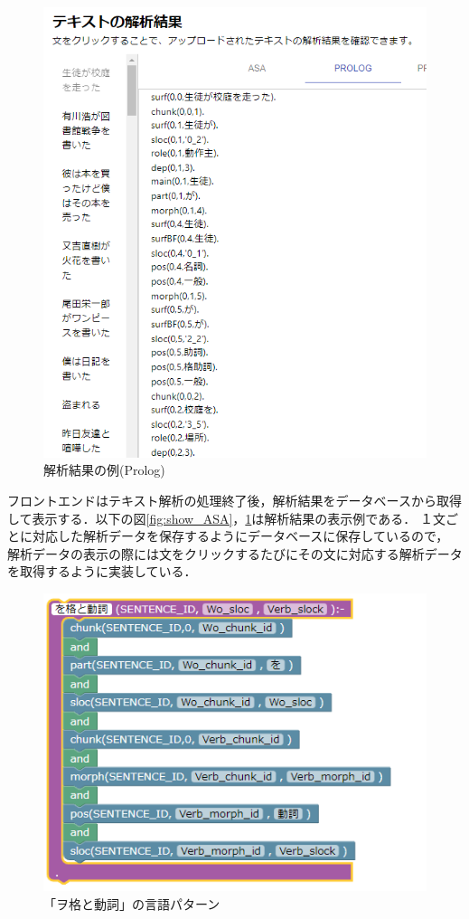 \documentclass{FITpaper}
\begin{document}
\begin{figure}[htbp]
  \centering
  \includegraphics[scale=0.4]{fig/convert_result_prolog.png}
  \caption{解析結果の例(Prolog)}
  \label{fig:show_prolog}
\end{figure}

フロントエンドはテキスト解析の処理終了後，解析結果をデータベースから取得して表示する．以下の図\ref{fig:show_ASA}，\ref{fig:show_prolog}は解析結果の表示例である．
１文ごとに対応した解析データを保存するようにデータベースに保存しているので，
解析データの表示の際には文をクリックするたびにその文に対応する解析データを取得するように実装している．


\begin{figure}[htbp]
  \centering
  \includegraphics[scale=0.6]{fig/wo.png}
  \caption{「ヲ格と動詞」の言語パターン}
  \label{fig:wo_block}
\end{figure}
\end{document}
